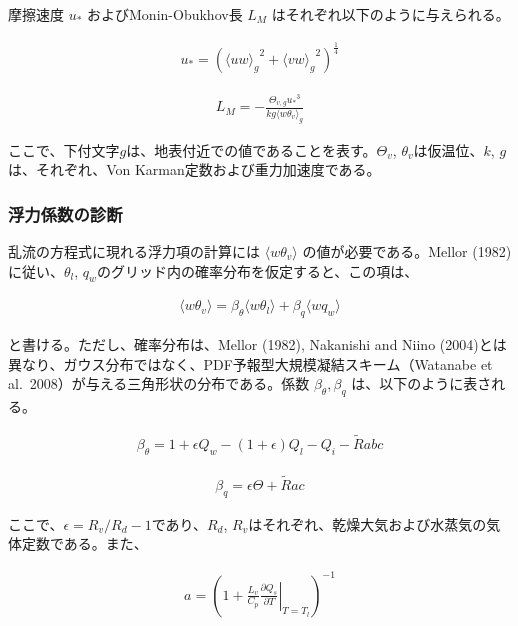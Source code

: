 摩擦速度 \(u_*\) およびMonin-Obukhov長 \(L_M\) はそれぞれ以下のように与えられる。

\begin{eqnarray}u_*=\left({\langle uw \rangle_g}^2+{\langle vw \rangle_g}^2 \right)^\frac{1}{4}\end{eqnarray}

\begin{eqnarray}L_M=-\frac{\Theta_{v,g} {u_*}^3}{kg \langle w\theta_v \rangle_g}\end{eqnarray}

ここで、下付文字\(g\)は、地表付近での値であることを表す。\(\Theta_v\), \(\theta_v\)は仮温位、\(k\), \(g\)は、それぞれ、Von Karman定数および重力加速度である。

\hypertarget{ux6d6eux529bux4fc2ux6570ux306eux8a3aux65ad}{%
\subsubsection{浮力係数の診断}\label{ux6d6eux529bux4fc2ux6570ux306eux8a3aux65ad}}

乱流の方程式に現れる浮力項の計算には \(\langle w\theta_v \rangle\) の値が必要である。Mellor (1982)に従い、\(\theta_l\), \(q_w\)のグリッド内の確率分布を仮定すると、この項は、

\begin{eqnarray}\langle w\theta_v \rangle=\beta_\theta \langle w\theta_l \rangle + \beta_q \langle wq_w \rangle\end{eqnarray}

と書ける。ただし、確率分布は、Mellor (1982), Nakanishi and Niino (2004)とは異なり、ガウス分布ではなく、PDF予報型大規模凝結スキーム（Watanabe et al.~2008）が与える三角形状の分布である。係数
\(\beta_\theta , \beta_q\) は、以下のように表される。

\begin{eqnarray}\beta_\theta=1+\epsilon Q_w-(1+\epsilon)Q_l-Q_i-\tilde{R}abc\end{eqnarray}

\begin{eqnarray}\beta_q=\epsilon \Theta +\tilde{R}ac\end{eqnarray}

ここで、\(\epsilon=R_v/R_d-1\)であり、\(R_d\), \(R_v\)はそれぞれ、乾燥大気および水蒸気の気体定数である。また、

\begin{eqnarray}a=\left(1+\frac{L_v}{C_p}\left.\frac{\partial Q_s}{\partial T}\right|_{T=T_l}\right)^{-1}\end{eqnarray}

